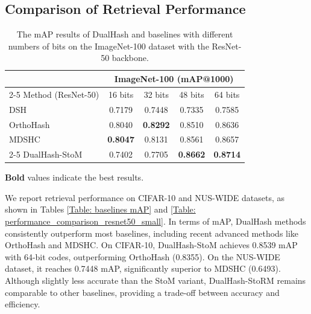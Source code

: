 \subsection{Comparison of Retrieval Performance}
\label{Subsection: Comparison of retrieval performance}
\begin{table}[!tbp]
    \centering
    \caption{The mAP results of DualHash and baselines with different numbers of bits on the ImageNet-100 dataset with the ResNet-50 backbone.}
    \label{tab:performance_imagenet_resnet50}
    \small
    \begin{tabular}{lcccc}
     \toprule
 & \multicolumn{4}{c}{ImageNet-100 (mAP@1000)} \\
\cmidrule(lr){2-5}
Method (ResNet-50) & 16 bits & 32 bits & 48 bits & 64 bits \\
\midrule
DSH~\cite{liuDeepSupervisedHashing} & 0.7179 & 0.7448 & 0.7335 & 0.7585 \\
OrthoHash~\cite{hoeOneLossAll2021} & 0.8040 & \textbf{0.8292} & 0.8510 & 0.8636 \\
MDSHC~\cite{wang2023deep} & \textbf{0.8047} & 0.8131 & 0.8561 & 0.8657 \\
 \cmidrule(lr){2-5}
DualHash-StoM & 0.7402 & 0.7705 & \textbf{0.8662} & \textbf{0.8714} \\
        \bottomrule
    \end{tabular}
    \par\vspace{3pt}
    \parbox{\linewidth}{\footnotesize
    \textbf{Bold} values indicate the best results.
    }
\end{table}
We report retrieval performance on CIFAR-10 and NUS-WIDE datasets, as shown in Tables \ref{Table: baselines mAP}
and \ref{Table: performance_comparison_resnet50_small}. 
In terms of mAP, DualHash methods consistently outperform most baselines, including recent advanced methods like OrthoHash and MDSHC.
On CIFAR-10, DualHash-StoM achieves 0.8539 mAP with 64-bit codes, outperforming OrthoHash (0.8355). On the NUS-WIDE dataset, it reaches 0.7448 mAP, significantly superior to MDSHC (0.6493).
Although slightly less accurate than the StoM variant, DualHash-StoRM remains comparable to other baselines, providing a trade-off between accuracy and efficiency. 

